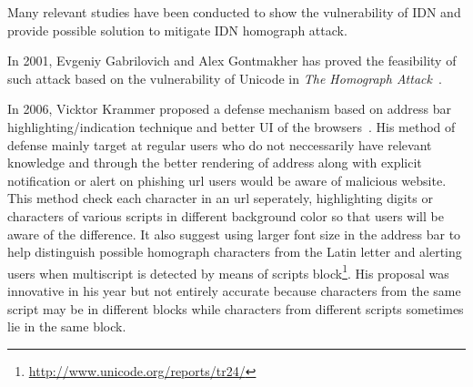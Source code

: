 \documentclass[letterpaper,twocolumn,10pt]{article}
\begin{document}
Many relevant studies have been conducted to show the vulnerability of IDN and provide possible solution to mitigate IDN homograph attack.

In 2001, Evgeniy Gabrilovich and Alex Gontmakher has proved the feasibility of such attack based on the vulnerability of Unicode in \textit{The Homograph Attack}~\cite{theHomoAttack}.

In 2006, Vicktor Krammer proposed a defense mechanism based on address bar highlighting/indication technique and better UI of the browsers~\cite{phishdefenseKV}.
His method of defense mainly target at regular users who do not neccessarily have relevant knowledge and through the better rendering of address along with explicit notification or alert on phishing url users would be aware of malicious website.
This method check each character in an url seperately, highlighting digits or characters of various scripts in different background color so that users will be aware of the difference.
It also suggest using larger font size in the address bar to help distinguish possible homograph characters from the Latin letter and alerting users when multiscript is detected by means of scripts block\footnote{\url{http://www.unicode.org/reports/tr24/}}.
His proposal was innovative in his year but not entirely accurate because characters from the same script may be in different blocks while characters from different scripts sometimes lie in the same block.
\end{document}
